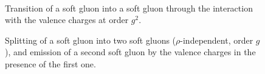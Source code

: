 \begin{figure}[t]
\centering
{}\qquad{}\qquad{}\\[4mm]
\qquad{}
\caption{Transition of a soft gluon into a soft gluon through the interaction with the valence charges at order $g^2$.}
\label{fig:g_g}
\end{figure}

\begin{figure}[t]
\centering
{}\qquad{}
\caption{Splitting of a soft gluon into two soft gluons ($\rho$-independent, order $g$), and emission of a second soft gluon by the valence charges in the presence of the first one.}
\label{fig:g_gg}
\end{figure}
